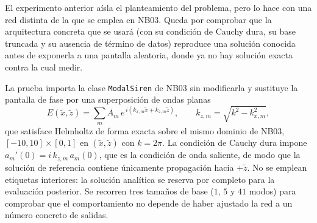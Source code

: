 El experimento anterior aísla el planteamiento del problema, pero lo hace con
una red distinta de la que se emplea en NB03. Queda por comprobar que la
arquitectura concreta que se usará (con su condición de Cauchy dura, su base
truncada y su ausencia de término de datos) reproduce una solución conocida
antes de exponerla a una pantalla aleatoria, donde ya no hay solución exacta
contra la cual medir.

La prueba importa la clase \texttt{ModalSiren} de NB03 sin modificarla y
sustituye la pantalla de fase por una superposición de ondas planas
\begin{equation}
    E(\tilde x,\tilde z)=\sum_m A_m\,
    e^{\,i\left(k_{x,m}\tilde x + k_{z,m}\tilde z\right)},
    \qquad k_{z,m}=\sqrt{k^{2}-k_{x,m}^{2}},
    \label{eq:campo_nb02b_arq}
\end{equation}
que satisface Helmholtz de forma exacta sobre el mismo dominio de NB03,
$[-10,10]\times[0,1]$ en $(\tilde x,\tilde z)$ con $k=2\pi$. La condición de
Cauchy dura impone $a_m'(0)=i\,k_{z,m}\,a_m(0)$, que es la condición de onda
saliente, de modo que la solución de referencia contiene únicamente
propagación hacia $+\tilde z$. No se emplean etiquetas interiores: la solución
analítica se reserva por completo para la evaluación posterior. Se recorren
tres tamaños de base ($1$, $5$ y $41$ modos) para comprobar que el
comportamiento no depende de haber ajustado la red a un número concreto de
salidas.

